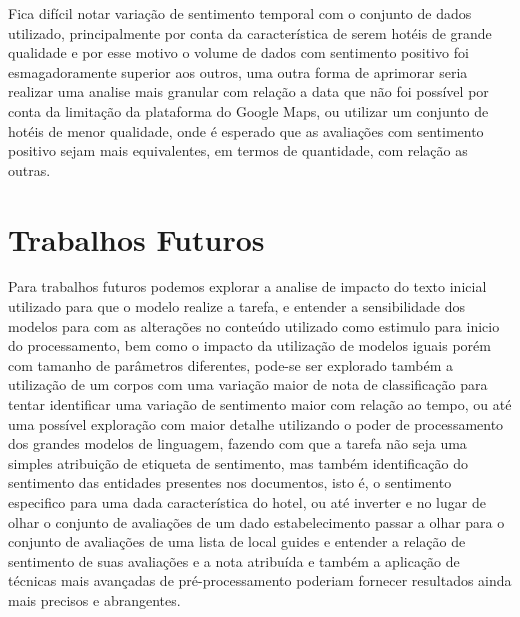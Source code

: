 Fica difícil notar variação de sentimento temporal com o conjunto de dados utilizado, principalmente por conta da característica de serem hotéis de grande qualidade e por esse motivo o volume de dados com sentimento positivo foi esmagadoramente superior aos outros, uma outra forma de aprimorar seria realizar uma analise mais granular com relação a data que não foi possível por conta da limitação da plataforma do Google Maps, ou utilizar um conjunto de hotéis de menor qualidade, onde é esperado que as avaliações com sentimento positivo sejam mais equivalentes, em termos de quantidade, com relação as outras.


\section{Trabalhos Futuros}
\label{cap:conclusao:sec:trab_futuros}

Para trabalhos futuros podemos explorar a analise de impacto do texto inicial utilizado para que o modelo realize a tarefa, e entender a sensibilidade dos modelos para com as alterações no conteúdo utilizado como estimulo para inicio do processamento, bem como o impacto da utilização de modelos iguais porém com tamanho de parâmetros diferentes, pode-se ser explorado também a utilização de um corpos com uma variação maior de nota de classificação para tentar identificar uma variação de sentimento maior com relação ao tempo, ou até uma possível exploração com maior detalhe utilizando o poder de processamento dos grandes modelos de linguagem, fazendo com que a tarefa não seja uma simples atribuição de etiqueta de sentimento, mas também identificação do sentimento das entidades presentes nos documentos, isto é, o sentimento especifico para uma dada característica do hotel, ou até inverter e no lugar de olhar o conjunto de avaliações de um dado estabelecimento passar a olhar para o conjunto de avaliações de uma lista de local guides e entender a relação de sentimento de suas avaliações e a nota atribuída e também a aplicação de técnicas mais avançadas de pré-processamento poderiam fornecer resultados ainda mais precisos e abrangentes.
